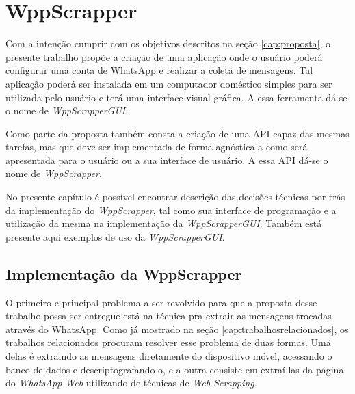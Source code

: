 


%
%
% 
% 
% 
% 

\chapter{WppScrapper}
\label{app:name}

Com a intenção cumprir com os objetivos descritos na seção \ref{cap:proposta}, o presente trabalho propõe a criação de uma aplicação onde o usuário poderá configurar uma conta de WhatsApp e realizar a coleta de mensagens. Tal aplicação poderá ser instalada em um computador doméstico simples para ser utilizada pelo usuário e terá uma interface visual gráfica. A essa ferramenta dá-se o nome de \textit{WppScrapperGUI}.

Como parte da proposta também consta a criação de uma API capaz das mesmas tarefas, mas que deve ser implementada de forma agnóstica a como será apresentada para o usuário ou a sua interface de usuário. A essa API dá-se o nome de \textit{WppScrapper}.

No presente capítulo é possível encontrar descrição das decisões técnicas por trás da implementação do \textit{WppScrapper}, tal como sua interface de programação e a utilização da mesma na implementação da \textit{WppScrapperGUI}. Também está presente aqui exemplos de uso da \textit{WppScrapperGUI}.

\section{Implementação da WppScrapper}
\label{cap:wppscrapper}

O primeiro e principal problema a ser revolvido para que a proposta desse trabalho possa ser entregue está na técnica pra extrair as mensagens trocadas através do WhatsApp. Como já mostrado na seção \ref{cap:trabalhosrelacionados}, os trabalhos relacionados procuram resolver esse problema de duas formas. Uma delas é extraindo as mensagens diretamente do dispositivo móvel, acessando o banco de dados e descriptografando-o, e a outra consiste em extraí-las da página do \textit{WhatsApp Web} utilizando de técnicas de \textit{Web Scrapping}.

